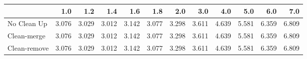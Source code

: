 \begin{tabular}{lrrrrrrrrrrr}
\toprule
{} &   1.0 &   1.2 &   1.4 &   1.6 &   1.8 &   2.0 &   3.0 &   4.0 &   5.0 &   6.0 &   7.0 \\
\midrule
No Clean Up  & 3.076 & 3.029 & 3.012 & 3.142 & 3.077 & 3.298 & 3.611 & 4.639 & 5.581 & 6.359 & 6.809 \\
Clean-merge  & 3.076 & 3.029 & 3.012 & 3.142 & 3.077 & 3.298 & 3.611 & 4.639 & 5.581 & 6.359 & 6.809 \\
Clean-remove & 3.076 & 3.029 & 3.012 & 3.142 & 3.077 & 3.298 & 3.611 & 4.639 & 5.581 & 6.359 & 6.809 \\
\bottomrule
\end{tabular}
